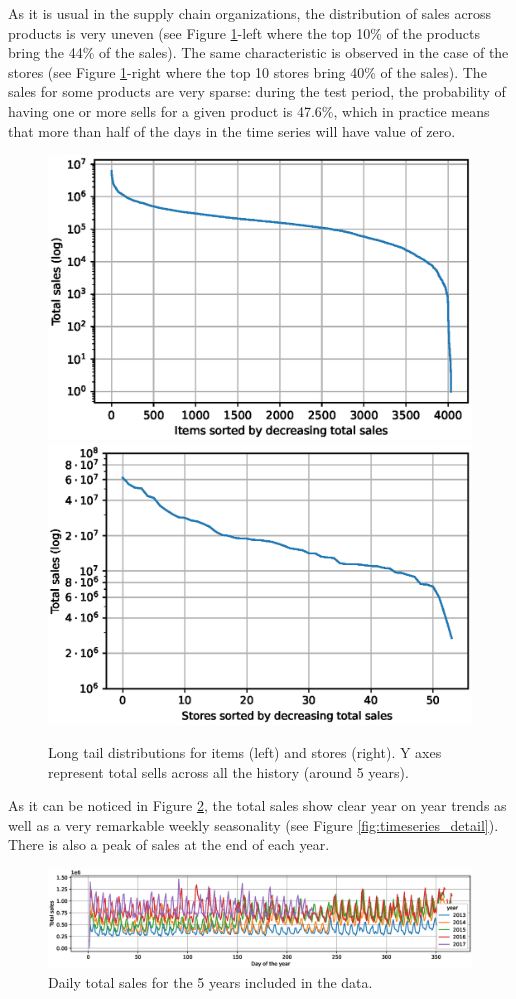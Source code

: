As it is usual in the supply chain organizations, the distribution of sales across products is very uneven (see Figure \ref{fig:tails}-left where the top 10\% of the products bring the 44\% of the sales). The same characteristic is observed in the case of the stores (see Figure \ref{fig:tails}-right where the top 10 stores bring 40\% of the sales). The sales for some products are very sparse: during the test period, the probability of having one or more sells for a given product is 47.6\%, which in practice means that more than half of the days in the time series will have value of zero.

\begin{figure}
	\centering
	\includegraphics[width=0.48\linewidth]{salesforecast/images/items_tail_log}
	\includegraphics[width=0.48\linewidth]{salesforecast/images/stores_tail_log}
	\caption{Long tail distributions for items (left) and stores (right). Y axes represent total sells across all the history (around 5 years).}
	\label{fig:tails}
\end{figure}

As it can be noticed in Figure \ref{fig:timeseries}, the total sales show clear year on year trends as well as a very remarkable weekly seasonality (see Figure \ref{fig:timeseries_detail}). There is also a peak of sales at the end of each year.

 	\begin{figure}
 	\centering
 	\includegraphics[width=1\textwidth]{salesforecast/images/timeseries}
 	\caption{Daily total sales for the 5 years included in the data.}
 	\label{fig:timeseries}
\end{figure}

